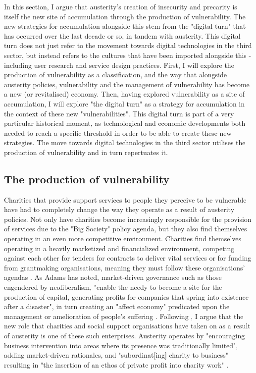 In this section, I argue that austerity's creation of insecurity and precarity is itself the new site of accumulation through the production of vulnerability. The new strategies for accumulation alongside this stem from the "digital turn" that has occurred over the last decade or so, in tandem with austerity. This digital turn does not just refer to the movement towards digital technologies in the third sector, but instead refers to the cultures that have been imported alongside this - including user research and service design practices. First, I will explore the production of vulnerability as a classification, and the way that alongside  austerity policies, vulnerability and the management of vulnerability has become a new (or revitalised) economy. Then, having explored vulnerability as a site of accumulation, I will explore "the digital turn" as a strategy for accumulation in the context of these new "vulnerabilities". This digital turn is part of a very particular historical moment, as technological and economic developments both needed to reach a specific threshold in order to be able to create these new strategies. The move towards digital technologies in the third sector utilises the production of vulnerability and in turn repertuates it.

\subsection{The production of vulnerability}
\label{the-production-of-vulnerability}

Charities that provide support services to people they perceive to be vulnerable have had to completely change the way they operate as a result of austerity policies. Not only have charities become increasingly responsible for the provision of services due to the "Big Society" policy agenda, but they also find themselves operating in an even more competitive environment. Charities find themselves operating in a heavily marketized and financialized environment, competing against each other for tenders for contracts to deliver vital services \citep{buckingham_capturing_2012} or for funding from grantmaking organisations, meaning they must follow these organisations' agendas \citep{clayton_distancing_2016}. As Adams has noted, market-driven governance such as those engendered by neoliberalism, "enable the needy to become a site for the production of capital, generating profits for companies that spring into existence after a disaster", in turn creating an "affect economy" predicated upon the management or amelioration of people's suffering \citep[9]{adams_markets_2013}. Following \citet{lord_profit_2018}, I argue that the new role that charities and social support organisations have taken on as a result of austerity is one of these such enterprises. Austerity operates by "encouraging business intervention into areas where its presence was traditionally limited", adding market-driven rationales, and "subordinat[ing] charity to business" resulting in "the insertion of an ethos of private profit into charity work" \citep[5]{lord_profit_2018}.

